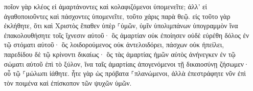 \documentclass{openreader}
\begin{document}
ποῖον γὰρ κλέος εἰ ἁμαρτάνοντες καὶ κολαφιζόμενοι ὑπομενεῖτε; ἀλλ’ εἰ ἀγαθοποιοῦντες καὶ πάσχοντες ὑπομενεῖτε, τοῦτο χάρις παρὰ θεῷ. 
εἰς τοῦτο γὰρ ἐκλήθητε, ὅτι καὶ Χριστὸς ἔπαθεν ὑπὲρ ⸀ὑμῶν, ὑμῖν ὑπολιμπάνων ὑπογραμμὸν ἵνα ἐπακολουθήσητε τοῖς ἴχνεσιν αὐτοῦ· 
ὃς ἁμαρτίαν οὐκ ἐποίησεν οὐδὲ εὑρέθη δόλος ἐν τῷ στόματι αὐτοῦ· 
ὃς λοιδορούμενος οὐκ ἀντελοιδόρει, πάσχων οὐκ ἠπείλει, παρεδίδου δὲ τῷ κρίνοντι δικαίως· 
ὃς τὰς ἁμαρτίας ἡμῶν αὐτὸς ἀνήνεγκεν ἐν τῷ σώματι αὐτοῦ ἐπὶ τὸ ξύλον, ἵνα ταῖς ἁμαρτίαις ἀπογενόμενοι τῇ δικαιοσύνῃ ζήσωμεν· οὗ τῷ ⸀μώλωπι ἰάθητε. 
ἦτε γὰρ ὡς πρόβατα ⸀πλανώμενοι, ἀλλὰ ἐπεστράφητε νῦν ἐπὶ τὸν ποιμένα καὶ ἐπίσκοπον τῶν ψυχῶν ὑμῶν. 
\end{document}
